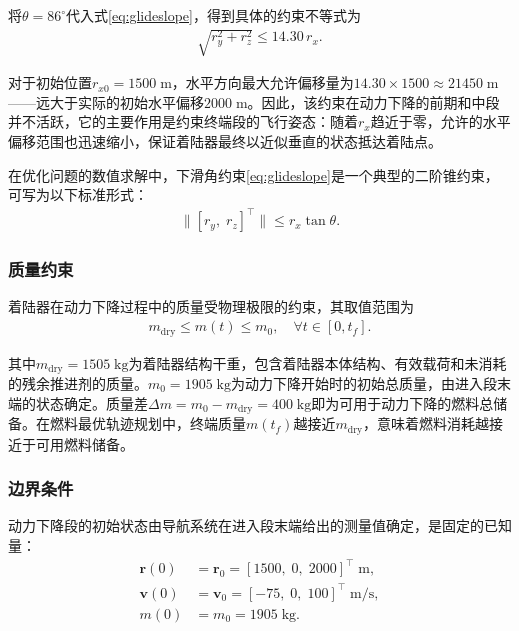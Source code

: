将$\theta = 86^\circ$代入式\eqref{eq:glideslope}，得到具体的约束不等式为
\begin{align}
    \sqrt{r_y^2 + r_z^2} \leq 14.30\,r_x. \label{eq:glideslope_num}
\end{align}

对于初始位置$r_{x0} = 1500\;\mathrm{m}$，水平方向最大允许偏移量为$14.30 \times 1500 \approx 21450\;\mathrm{m}$——远大于实际的初始水平偏移$2000\;\mathrm{m}$。因此，该约束在动力下降的前期和中段并不活跃，它的主要作用是约束终端段的飞行姿态：随着$r_x$趋近于零，允许的水平偏移范围也迅速缩小，保证着陆器最终以近似垂直的状态抵达着陆点。

在优化问题的数值求解中，下滑角约束\eqref{eq:glideslope}是一个典型的二阶锥约束，可写为以下标准形式：
\begin{align}
    \|[r_y,\; r_z]^{\top}\| \leq r_x\tan\theta.
\end{align}

\subsubsection{质量约束}

着陆器在动力下降过程中的质量受物理极限的约束，其取值范围为
\begin{align}
    m_{\mathrm{dry}} \leq m(t) \leq m_0, \quad \forall t \in [0, t_f]. \label{eq:mass_bound}
\end{align}

其中$m_{\mathrm{dry}} = 1505\;\mathrm{kg}$为着陆器结构干重，包含着陆器本体结构、有效载荷和未消耗的残余推进剂的质量。$m_0 = 1905\;\mathrm{kg}$为动力下降开始时的初始总质量，由进入段末端的状态确定。质量差$\Delta m = m_0 - m_{\mathrm{dry}} = 400\;\mathrm{kg}$即为可用于动力下降的燃料总储备。在燃料最优轨迹规划中，终端质量$m(t_f)$越接近$m_{\mathrm{dry}}$，意味着燃料消耗越接近于可用燃料储备。

\subsubsection{边界条件}

动力下降段的初始状态由导航系统在进入段末端给出的测量值确定，是固定的已知量：
\begin{align}
    \bm{r}(0) &= \bm{r}_0 = [1500,\;0,\;2000]^{\top}\;\mathrm{m}, \\
    \bm{v}(0) &= \bm{v}_0 = [-75,\;0,\;100]^{\top}\;\mathrm{m/s}, \\
    m(0)     &= m_0 = 1905\;\mathrm{kg}. \label{eq:init_cond}
\end{align}

